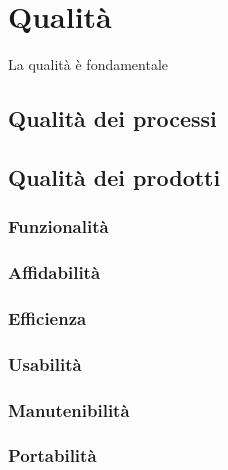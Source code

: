 \section{Qualità}
La qualità è fondamentale
	\subsection{Qualità dei processi}
	\subsection{Qualità dei prodotti}
		\subsubsection{Funzionalità}
		\subsubsection{Affidabilità}
		\subsubsection{Efficienza}
		\subsubsection{Usabilità}
		\subsubsection{Manutenibilità}
		\subsubsection{Portabilità}
